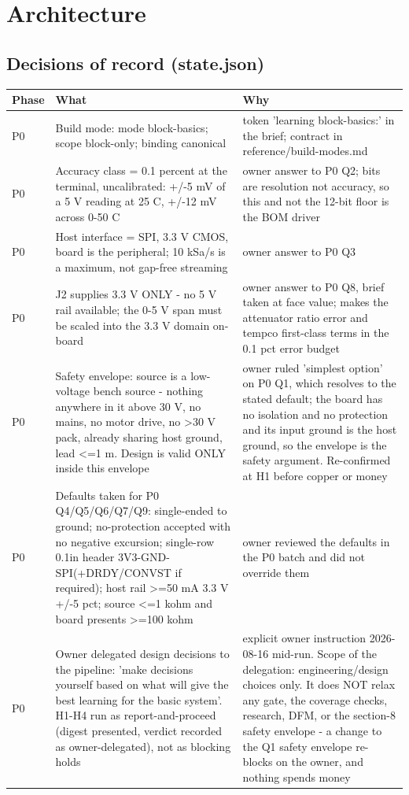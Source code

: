 \documentclass[11pt,a4paper]{article}
\begin{document}
\section{Architecture}
\subsection*{Decisions of record (state.json)}
{\small
\begin{longtable}{lp{5.2cm}p{7.2cm}}
\toprule
\textbf{Phase} & \textbf{What} & \textbf{Why} \\
\midrule
\endhead
P0 & Build mode: mode block-basics; scope block-only; binding canonical & token 'learning block-basics:' in the brief; contract in reference/build-modes.md \\
P0 & Accuracy class = 0.1 percent at the terminal, uncalibrated: +/-5 mV of a 5 V reading at 25 C, +/-12 mV across 0-50 C & owner answer to P0 Q2; bits are resolution not accuracy, so this and not the 12-bit floor is the BOM driver \\
P0 & Host interface = SPI, 3.3 V CMOS, board is the peripheral; 10 kSa/s is a maximum, not gap-free streaming & owner answer to P0 Q3 \\
P0 & J2 supplies 3.3 V ONLY - no 5 V rail available; the 0-5 V span must be scaled into the 3.3 V domain on-board & owner answer to P0 Q8, brief taken at face value; makes the attenuator ratio error and tempco first-class terms in the 0.1 pct error budget \\
P0 & Safety envelope: source is a low-voltage bench source - nothing anywhere in it above 30 V, no mains, no motor drive, no \textgreater{}30 V pack, already sharing host ground, lead \textless{}=1 m. Design is valid ONLY inside this envelope & owner ruled 'simplest option' on P0 Q1, which resolves to the stated default; the board has no isolation and no protection and its input ground is the host ground, so the envelope is the safety argument. Re-confirmed at H1 before copper or money \\
P0 & Defaults taken for P0 Q4/Q5/Q6/Q7/Q9: single-ended to ground; no-protection accepted with no negative excursion; single-row 0.1in header 3V3-GND-SPI(+DRDY/CONVST if required); host rail \textgreater{}=50 mA 3.3 V +/-5 pct; source \textless{}=1 kohm and board presents \textgreater{}=100 kohm & owner reviewed the defaults in the P0 batch and did not override them \\
P0 & Owner delegated design decisions to the pipeline: 'make decisions yourself based on what will give the best learning for the basic system'. H1-H4 run as report-and-proceed (digest presented, verdict recorded as owner-delegated), not as blocking holds & explicit owner instruction 2026-08-16 mid-run. Scope of the delegation: engineering/design choices only. It does NOT relax any gate, the coverage checks, research, DFM, or the section-8 safety envelope - a change to the Q1 safety envelope re-blocks on the owner, and nothing spends money \\

\end{longtable}}
\end{document}
